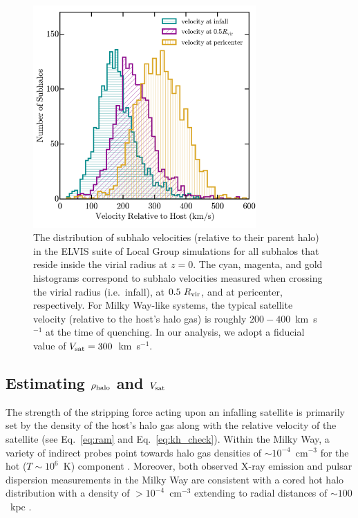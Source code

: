 \documentclass[usenatbib]{mn2e}
\begin{document}
\begin{figure}
 \centering
 \hspace*{-0.07in}
 \includegraphics[width=3.35in]{f1.png}
 \caption{The distribution of subhalo velocities (relative to their
   parent halo) in the ELVIS suite of Local Group simulations for all
   subhalos that reside inside the virial radius at $z = 0$. The cyan,
   magenta, and gold histograms correspond to
   subhalo velocities measured when crossing the virial radius
   (i.e.~infall), at $0.5~R_{\rm vir}$, and at pericenter,
   respectively. For Milky Way-like systems, the typical satellite
   velocity (relative to the host's halo gas) is roughly
   $200-400$~km~s$^{-1}$ at the time of quenching. In our analysis, we
   adopt a fiducial value of $V_{\rm sat} = 300$~km~s$^{-1}$.}
 \label{fig:vel}
\end{figure}

\subsection{Estimating \boldmath$\rho_{\rm halo}$ and \boldmath$V_{\rm sat}$}
\label{subsec:rhoV}

The strength of the stripping force acting upon an infalling satellite is
primarily set by the density of the host's halo gas along with the
relative velocity of the satellite (see Eq.~\ref{eq:ram} and Eq.~\ref{eq:kh_check}).
%
Within the Milky Way, a variety of indirect probes point towards halo
gas densities of $\sim 10^{-4}$~cm$^{-3}$ for the hot
($T\sim10^{6}$~K) component \citep[e.g.][]{weiner96, snez02, fox05,
  grcevich09, salem15}.
%
Moreover, both observed X-ray emission and pulsar dispersion
measurements in the Milky Way are consistent with a cored hot halo
distribution with a density of $> 10^{-4}$~cm$^{-3}$
extending to radial distances of $\sim100$~kpc \citep[][see also
\citealt{anderson10, gupta12, miller13, miller15, fsm16}]{fang13}.
%
\end{document}
